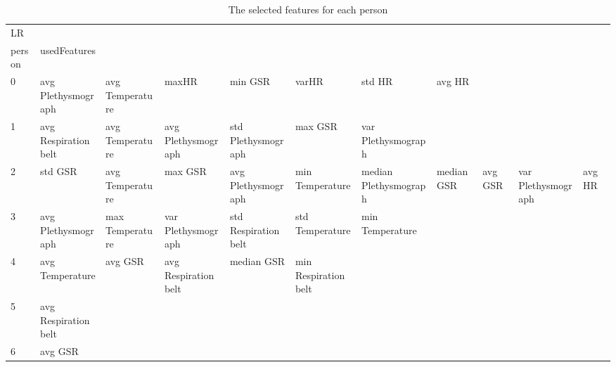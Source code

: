 \begin{landscape}
\begin{table}[]
\centering
\caption{The selected features for each person}
\begin{tabular}{l|llllllll}
LR       &                         &                         &                         &                         &                         &                       &                         &                         &                         &         \\
person   & usedFeatures            &                         &                         &                         &                         &                       &                         &                         &                         &         \\
0        & avg Plethysmograph      & avg Temperature         & maxHR                   & min GSR                 & varHR                   & std HR                & avg HR                  &                         &                         &         \\
1        & avg Respiration belt    & avg Temperature         & avg Plethysmograph      & std Plethysmograph      & max GSR                 & var Plethysmograph    &                         &                         &                         &         \\
2        & std GSR                 & avg Temperature         & max GSR                 & avg Plethysmograph      & min Temperature         & median Plethysmograph & median GSR              & avg GSR                 & var Plethysmograph      & avg HR  \\
3        & avg Plethysmograph      & max Temperature         & var Plethysmograph      & std Respiration belt    & std Temperature         & min Temperature       &                         &                         &                         &         \\
4        & avg Temperature         & avg GSR                 & avg Respiration belt    & median GSR              & min Respiration belt    &                       &                         &                         &                         &         \\
5        & avg Respiration belt    &                         &                         &                         &                         &                       &                         &                         &                         &         \\
6        & avg GSR                 &                         &                         &                         &                         &                       &                         &                         &                         &         \\

\end{tabular}
\end{table}
\end{landscape}
